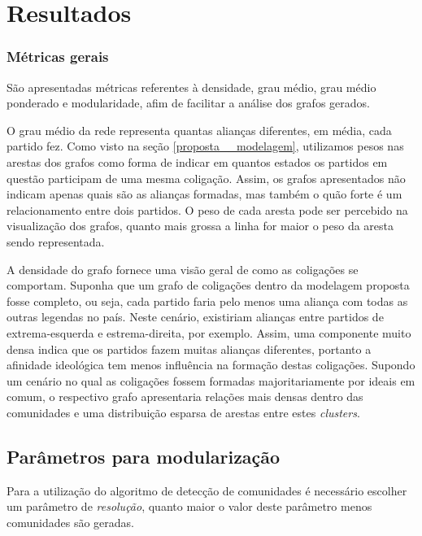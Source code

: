 \chapter{Resultados}
\label{resultados}

\subsection{Métricas gerais}
\label{proposta__objetivos-especificos--dados-gerais}

São apresentadas métricas referentes à densidade, grau médio, grau médio ponderado e modularidade, afim de facilitar a análise dos grafos gerados.

O grau médio da rede representa quantas alianças diferentes, em média, cada partido fez. Como visto na seção \ref{proposta__modelagem}, utilizamos pesos nas arestas dos grafos como forma de indicar em quantos estados os partidos em questão participam de uma mesma coligação. Assim, os grafos apresentados não indicam apenas quais são as alianças formadas, mas também o quão forte é um relacionamento entre dois partidos. O peso de cada aresta pode ser percebido na visualização dos grafos, quanto mais grossa a linha for maior o peso da aresta sendo representada.

A densidade do grafo fornece uma visão geral de como as coligações se comportam. Suponha que um grafo de coligações dentro da modelagem proposta fosse completo, ou seja, cada partido faria pelo menos uma aliança com todas as outras legendas no país. Neste cenário, existiriam alianças entre partidos de extrema-esquerda e estrema-direita, por exemplo. Assim, uma componente muito densa indica que os partidos fazem muitas alianças diferentes, portanto a afinidade ideológica tem menos influência na formação destas coligações. Supondo um cenário no qual as coligações fossem formadas majoritariamente por ideais em comum, o respectivo grafo apresentaria relações mais densas dentro das comunidades e uma distribuição esparsa de arestas entre estes \emph{clusters}.

\section{Parâmetros para modularização}
\label{resultados__parametros-modularizacao}

Para a utilização do algoritmo de detecção de comunidades é necessário escolher um parâmetro de \emph{resolução}, quanto maior o valor deste parâmetro menos comunidades são geradas.


